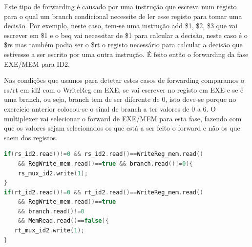 \documentclass[pdftex,12pt,a4paper]{report}
\begin{document}
\begin{table}[!htb]
\centering
\label{table_exe_mem_id2}
\end{table}

Este tipo de forwarding é causado por uma instrução que escreva num registo para o qual um branch condicional necessite de ler esse registo para tomar uma decisão. Por exemplo, neste caso, tem-se uma instrução add \$1, \$2, \$3 que vai escrever em \$1 e o beq vai necessitar de \$1 para calcular a decisão, neste caso é o \$rs mas também podia ser o \$rt o registo necessário para calcular a decisão que estivesse a ser escrito por uma outra instrução. É feito então o forwarding da fase EXE/MEM para ID2.

Nas condições que usamos para detetar estes casos de forwarding comparamos o rs/rt em id2 com o WriteReg em EXE, se vai escrever no registo em EXE e se é uma branch, ou seja, branch tem de ser diferente de 0, isto deve-se porque no exercício anterior colocou-se o sinal de branch a ter valores de 0 a 6. O multiplexer vai selecionar o forward de EXE/MEM para esta fase, fazendo com que os valores sejam selecionados os que está a ser feito o forward e não os que saem dos registos.

\begin{lstlisting}[language=c]
if(rs_id2.read()!=0 && rs_id2.read()==WriteReg_mem.read() 
	&& RegWrite_mem.read()==true && branch.read()!=0){
    rs_mux_id2.write(1);
}
if(rt_id2.read()!=0 && rt_id2.read()==WriteReg_mem.read() 
	&& RegWrite_mem.read()==true 
	&& branch.read()!=0 
	&& MemRead.read()==false){
   rt_mux_id2.write(1);
}
\end{lstlisting} 
\end{document}
